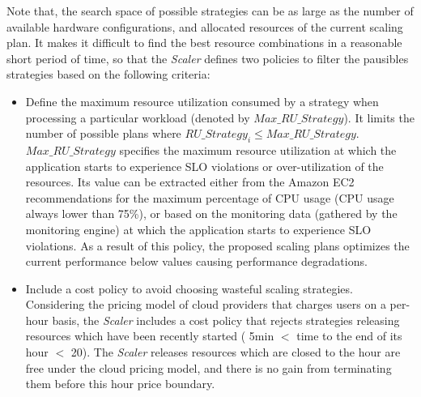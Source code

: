 
Note that, the search space of possible strategies can be as large as the number of available hardware configurations, and allocated resources of the current scaling plan. It makes it difficult to find the best resource combinations in a reasonable short period of time, so that the \emph{Scaler} defines two policies to filter the pausibles strategies based on the following criteria:


\begin{itemize}

\item Define the maximum resource utilization consumed  by a strategy when processing a particular workload (denoted by \emph{$Max\_RU\_Strategy$}). It limits the number of possible plans where \emph{$RU\_Strategy_{i} \leq Max\_RU\_Strategy$}. \emph{$Max\_RU\_Strategy$} specifies the maximum resource utilization at which the application starts to experience SLO violations or over-utilization of the resources. Its value can be extracted either from the Amazon EC2 recommendations for the maximum percentage of CPU usage (CPU usage always lower than 75\%), or based on the monitoring data (gathered by the monitoring engine) at which the application starts to experience SLO violations. As a result of this policy, the proposed scaling plans optimizes the current performance below values causing performance degradations. 


\item Include a cost policy to avoid choosing wasteful scaling strategies. Considering the pricing model of cloud providers that charges users on a per-hour basis, the \emph{Scaler} includes a cost policy that rejects strategies releasing resources which have been recently started ( 5min $<$ time to the end of its hour $<$ 20). The \emph{Scaler} releases resources which are closed to the hour are free under the cloud pricing model, and there is no gain from terminating them before this hour price boundary.

\end{itemize}

